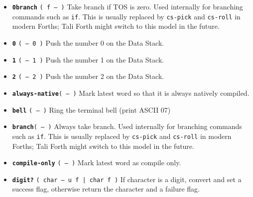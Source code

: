 \begin{itemize}

        \item \textbf{\texttt{0branch}} \texttt{( f -- )} 
                Take branch if TOS is zero. Used internally for branching
                commands such as \texttt{if}. This is
                usually replaced by
                \texttt{cs-pick} and 
                \texttt{cs-roll} in modern
                Forths; Tali Forth might switch to this model in the future.

        \item \textbf{\texttt{0}} \texttt{( -- 0 )} 
                Push the number 0 on the Data Stack.

        \item \textbf{\texttt{1}} \texttt{( -- 1 )} 
                Push the number 1 on the Data Stack.

        \item \textbf{\texttt{2}} \texttt{( -- 2 )} 
                Push the number 2 on the Data Stack.

        \item \textbf{\texttt{always-native}}\texttt{( -- )} 
                Mark latest word so that it is always natively compiled. 
   
        \item \textbf{\texttt{bell}} \texttt{( -- )} 
                Ring the terminal bell (print ASCII 07)

        \item \textbf{\texttt{branch}}\texttt{( -- )} 
                Always take branch. Used internally for branching commands such
                as \texttt{if}. This is usually replaced
                by \texttt{cs-pick} and
                \texttt{cs-roll} in modern
                Forths; Tali Forth might switch to this model in the future.

        \item \textbf{\texttt{compile-only}}
                \texttt{( -- )} Mark latest word as compile only.

        \item \textbf{\texttt{digit?}} 
                \texttt{( char -- u f | char f )} If character is a digit,
                convert and set a success flag, otherwise return the character
                and a failure flag.


\end{itemize}
